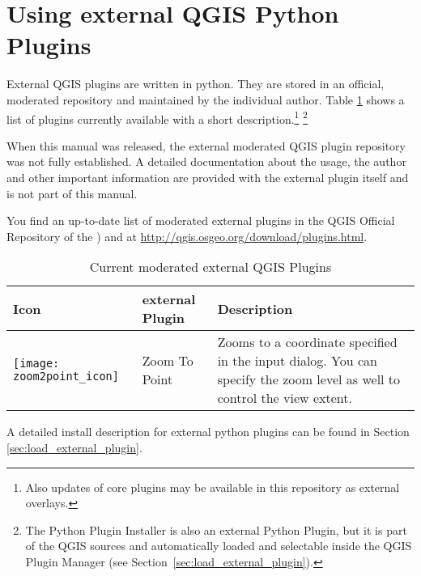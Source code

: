 
\section{Using external QGIS Python Plugins}\label{sec:external_plugins}


External QGIS plugins are written in python. They are stored in 
an official, moderated repository and maintained by the individual 
author. Table \ref{tab:external_plugins} shows a list of plugins 
currently available with a short description.\footnote{Also updates of 
core plugins may be available in this repository as external overlays.} 
\footnote{The Python Plugin Installer is also an external Python Plugin, but 
it is part of the QGIS sources and automatically loaded and selectable inside
the QGIS Plugin Manager (see Section~\ref{sec:load_external_plugin}).}

When this manual was released, the external moderated QGIS plugin repository
was not fully established. A detailed documentation about the usage, the
author and other important information are provided with the external plugin
itself and is not part of this manual.

You find an up-to-date list of moderated external plugins in the QGIS
Official Repository of the ) and at \url{http://qgis.osgeo.org/download/plugins.html}. 

\begin{table}[H]
\centering
\caption{Current moderated external QGIS Plugins}\label{tab:external_plugins}\medskip
\small
 \begin{tabular}{|l|l|p{4in}|}
\hline \textbf{Icon} & \textbf{external Plugin} & \textbf{Description}\\
\hline
\texttt{[image: zoom2point\_icon]}
 & Zoom To Point \index{plugins!Zoom To Point} & Zooms to a coordinate 
  specified in the input dialog. You can specify the zoom level as well to 
  control the view extent.\\
\hline
\end{tabular}
\end{table}

A detailed install description for external python plugins can be found in 
Section \ref{sec:load_external_plugin}.

